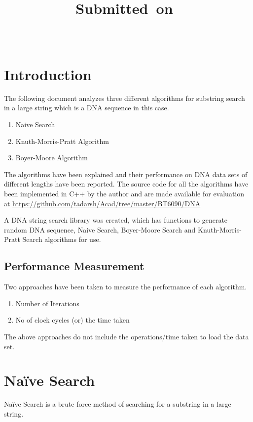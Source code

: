 \documentclass{article}
\title{
    \vspace{2in}
    \textmd{\textbf{\hmwkClass}}\\
    \textmd{\textbf{\hmwkTitle}}\\
    \normalsize\vspace{0.1in}\small{Submitted\ on\ \hmwkDueDate}\\
    \vspace{0.1in}\large{\textit{\hmwkClassInstructor\ \hmwkClassTime}}
    \vspace{3in}
}
\author{\textbf{\hmwkAuthorName}}
\date{}
\begin{document}
\maketitle

\pagebreak

\section{Introduction}

The following document analyzes three different algorithms for substring search in a large string which is a DNA sequence in this case.
\begin{enumerate}
	\item Naive Search
	\item Knuth-Morris-Pratt Algorithm
	\item Boyer-Moore Algorithm
\end{enumerate}

The algorithms have been explained and their performance on DNA data sets of different lengths have been reported. The source code for all the algorithms have been implemented in C++ by the author and are made available for evaluation at \url{https://github.com/tadarsh/Acad/tree/master/BT6090/DNA} 

A DNA string search library was created, which has functions to generate random DNA sequence, Naive Search, Boyer-Moore Search and Knuth-Morris-Pratt Search algorithms for use.

\subsection{Performance Measurement}

Two approaches have been taken to measure the performance of each algorithm.

\begin{enumerate}
	\item Number of Iterations
	\item No of clock cycles (or) the time taken
\end{enumerate}

The above approaches do not include the operations/time taken to load the data set.

\section{Na\"ive Search}

Na\"ive Search is a brute force method of searching for a substring in a large string. 
\end{document}
